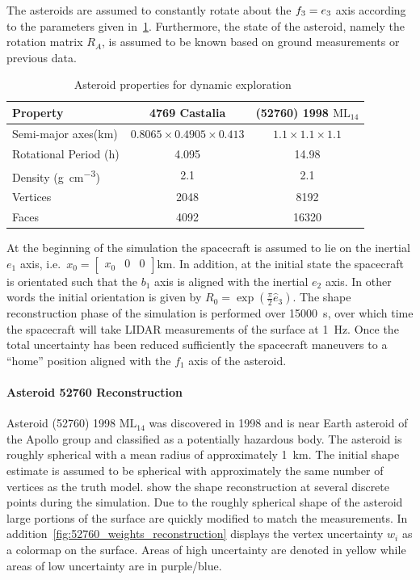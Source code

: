 \documentclass[journal]{new-aiaa}
\begin{document}
The asteroids are assumed to constantly rotate about the \( f_3 = e_3\) axis according to the parameters given in~\cref{tab:dynamic_asteroids}.
Furthermore, the state of the asteroid, namely the rotation matrix \( R_A \), is assumed to be known based on ground measurements or previous data.
\begin{table}[htbp]
    \centering
    \begin{tabular}{lcc}
        \toprule
        Property & \num{4769} Castalia & (\num{52760}) \num{1998} \(\text{ML}_{14}\) \\
        \midrule
        Semi-major axes(\si{\kilo\meter}) & \( 0.8065 \times 0.4905 \times 0.413 \) & \( 1.1 \times 1.1 \times 1.1 \) \\
        Rotational Period (\si{\hour}) & \num{4.095} & \num{14.98} \\
        Density (\si{\gram\per\centi\meter^3}) & \num{2.1} & \num{2.1} \\
        Vertices & \num{2048}  & \num{8192} \\
        Faces & \num{4092} & \num{16320} \\
        \bottomrule
    \end{tabular}
    \caption{Asteroid properties for dynamic exploration~\label{tab:dynamic_asteroids}}
\end{table}
At the beginning of the simulation the spacecraft is assumed to lie on the inertial \( e_1 \) axis, i.e.\ \( x_0 = \begin{bmatrix} x_0 & 0 & 0 \end{bmatrix} \si{\kilo\meter} \).
In addition, at the initial state the spacecraft is orientated such that the \( b_1 \) axis is aligned with the inertial \( e_2 \) axis.
In other words the initial orientation is given by \( R_0 = \exp(\frac{\pi}{2} \hat{e}_3)\).
The shape reconstruction phase of the simulation is performed over \SI{15000}{\second}, over which time the spacecraft will take LIDAR measurements of the surface at \SI{1}{\hertz}.
Once the total uncertainty has been reduced sufficiently the spacecraft maneuvers to a ``home'' position aligned with the \( f_1 \) axis of the asteroid.

\paragraph{Asteroid 52760 Reconstruction}

Asteroid (\num{52760}) \num{1998} \(\text{ML}_{14}\) was discovered in \num{1998} and is near Earth asteroid of the Apollo group and classified as a potentially hazardous body.
The asteroid is roughly spherical with a mean radius of approximately \SI{1}{\kilo\meter}.
The initial shape estimate is assumed to be spherical with approximately the same number of vertices as the truth model.
 show the shape reconstruction at several discrete points during the simulation.
Due to the roughly spherical shape of the asteroid large portions of the surface are quickly modified to match the measurements.
In addition~\cref{fig:52760_weights_reconstruction} displays the vertex uncertainty \( w_i \) as a colormap on the surface. 
Areas of high uncertainty are denoted in yellow while areas of low uncertainty are in purple/blue.
\end{document}
